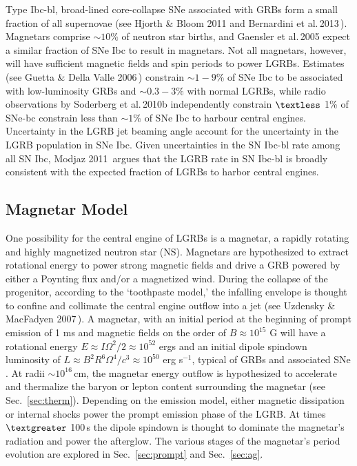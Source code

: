 \documentclass{article}
\begin{document}
Type Ibc-bl, broad-lined core-collapse SNe associated with GRBs form a small fraction of all supernovae (see Hjorth \& Bloom 2011 \cite{Hjorth:2012} and Bernardini et al.\,2013\,\cite{Bernardini:2013nfa}). Magnetars comprise $\sim 10\%$ of neutron star births, and Gaensler et al.\,2005 \cite{Gaensler:2005qk} expect a similar fraction of SNe Ibc to result in magnetars. Not all magnetars, however, will have sufficient magnetic fields and spin periods to power LGRBs. Estimates (see Guetta \& Della Valle 2006\,\cite{Guetta:2006gq}) constrain $\sim 1-9\%$ of SNe Ibc to be associated with low-luminosity GRBs and $\sim 0.3-3\%$ with normal LGRBs, while radio observations by Soderberg et al.\,2010b \cite{Sodnat:2010} independently constrain $\textless$ 1\% of SNe-bc  constrain less than $\sim 1\%$ of SNe Ibc to harbour central engines. Uncertainty in the LGRB jet beaming angle account for the uncertainty in the LGRB population in SNe Ibc. Given uncertainties in the SN Ibc-bl rate among all SN Ibc, Modjaz 2011\,\cite{Modjaz:2011} argues that the LGRB rate in SN Ibc-bl is broadly consistent with the expected fraction of LGRBs to harbor central engines.

\subsection{Magnetar Model}

One possibility for the central engine of LGRBs is a magnetar, a rapidly rotating and highly magnetized neutron star (NS). Magnetars are hypothesized to extract rotational energy to power strong magnetic fields and drive a GRB powered by either a Poynting flux and/or a magnetized wind. During the collapse of the progenitor, according to the `toothpaste model,'\cite{Uzdensky:2006wj} the infalling envelope is thought to confine and collimate the central engine outflow into a jet (see Uzdensky \& MacFadyen 2007\,\cite{Uzdensky:2006wj}). A magnetar, with an initial period at the beginning of prompt emission of 1 ms and magnetic fields on the order of $B \approx 10^{15}$ G will have a rotational energy $E \approx I \Omega^2/2 \approx 10^{52}$ ergs and an initial dipole spindown luminosity of $L \approx B^2 R^6\Omega^4/c^3 \approx 10^{50}$ erg s$^{-1}$, typical of GRBs and associated SNe \cite{Woosley:2006fn}. At radii $\sim 10^{16}$\,cm, the magnetar energy outflow is hypothesized to accelerate and thermalize the baryon or lepton content surrounding the magnetar (see Sec.~\ref{sec:therm}). Depending on the emission model, either magnetic dissipation or internal shocks power the prompt emission phase of the LGRB. At times $\textgreater$ 100\,s the dipole spindown is thought to dominate the magnetar's radiation and power the afterglow. The various stages of the magnetar's period evolution are explored in Sec.~\ref{sec:prompt} and Sec.~\ref{sec:ag}.
\end{document}
